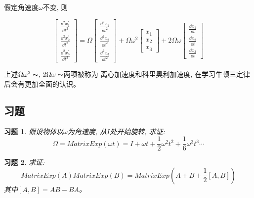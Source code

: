 \documentclass{ctexart}
\numberwithin{equation}{subsection}
\numberwithin{theorem}{subsection}
\numberwithin{definition}{subsection}
\numberwithin{proof}{subsection}
\numberwithin{lemma}{subsection}
\numberwithin{example}{subsection}
\numberwithin{remark}{subsection}
\numberwithin{corollary}{subsection}
\newtheorem{exercise}   {习题}
\numberwithin{exercise}{subsection}
\numberwithin{problem}{subsection}
\numberwithin{question}{section}
\numberwithin{method}{subsection}
\begin{document}
        假定角速度$\omega$不变, 则

        \begin{equation}
            \begin{bmatrix}
                \frac{\dd^2 x_1^\prime}{\dd t^2} \\
                \frac{\dd^2 x_2^\prime}{\dd t^2} \\
                \frac{\dd^2 x_3^\prime}{\dd t^2}
            \end{bmatrix} = \Omega \begin{bmatrix}
                \frac{\dd^2 x_1}{\dd t^2} \\
                \frac{\dd^2 x_2}{\dd t^2} \\
                \frac{\dd^2 x_3}{\dd t^2}
            \end{bmatrix} + \Omega \omega^2 \begin{bmatrix}
                x_1 \\
                x_2 \\
                x_3
            \end{bmatrix} + 2\Omega \omega \begin{bmatrix}
                \frac{\dd x_1}{\dd t} \\
                \frac{\dd x_2}{\dd t} \\
                \frac{\dd x_3}{\dd t}
            \end{bmatrix}
        \end{equation}

        上述$\Omega\omega^2\thicksim$, $2\Omega\omega\thicksim$两项被称为
        离心加速度和科里奥利加速度, 在学习牛顿三定律后会有更加全面的认识。

    \subsection{习题}

    \begin{exercise}
        假设物体以$\omega$为角速度, 从$I$处开始旋转, 求证:
        \begin{equation}
            \Omega = MatrixExp(\omega t) = I + \omega t + \frac{1}{2}\omega^2 t^2 + \frac{1}{6} \omega^3 t^3 \cdots
        \end{equation}
    \end{exercise}

    \begin{exercise}
        求证:
        \begin{equation}
            MatrixExp(A) MatrixExp(B) = MatrixExp(A + B + \frac{1}{2} [A, B])
        \end{equation}
        其中$[A, B] = AB - BA$。
    \end{exercise}
\end{document}
